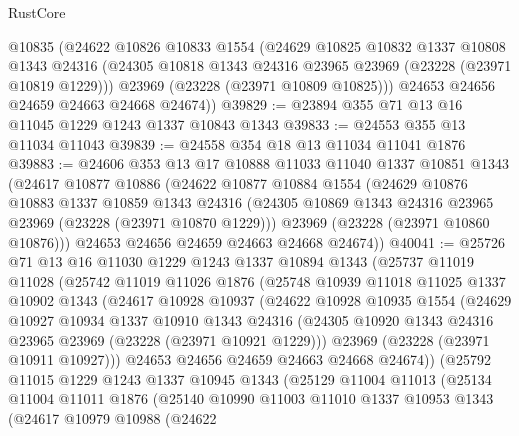 \begin{lexlean}{RustCore}
\begin{coremodule}
      @10835
      (@24622
        @10826
        @10833
        @1554
        (@24629
          @10825
          @10832
          @1337
          @10808
          @1343
          @24316
          (@24305 @10818 @1343 @24316 @23965 @23969 (@23228 (@23971 @10819 @1229)))
          @23969
          (@23228 (@23971 @10809 @10825)))
        @24653
        @24656
        @24659
        @24663
        @24668
        @24674))
@39829 := @23894 @355 @71 @13 @16 @11045 @1229 @1243 @1337 @10843 @1343
@39833 := @24553 @355 @13 @11034 @11043
@39839 := @24558 @354 @18 @13 @11034 @11041 @1876
@39883 := @24606
    @353
    @13
    @17
    @10888
    @11033
    @11040
    @1337
    @10851
    @1343
    (@24617
      @10877
      @10886
      (@24622
        @10877
        @10884
        @1554
        (@24629
          @10876
          @10883
          @1337
          @10859
          @1343
          @24316
          (@24305 @10869 @1343 @24316 @23965 @23969 (@23228 (@23971 @10870 @1229)))
          @23969
          (@23228 (@23971 @10860 @10876)))
        @24653
        @24656
        @24659
        @24663
        @24668
        @24674))
@40041 := @25726
    @71
    @13
    @16
    @11030
    @1229
    @1243
    @1337
    @10894
    @1343
    (@25737
      @11019
      @11028
      (@25742
        @11019
        @11026
        @1876
        (@25748
          @10939
          @11018
          @11025
          @1337
          @10902
          @1343
          (@24617
            @10928
            @10937
            (@24622
              @10928
              @10935
              @1554
              (@24629
                @10927
                @10934
                @1337
                @10910
                @1343
                @24316
                (@24305 @10920 @1343 @24316 @23965 @23969 (@23228 (@23971 @10921 @1229)))
                @23969
                (@23228 (@23971 @10911 @10927)))
              @24653
              @24656
              @24659
              @24663
              @24668
              @24674))
          (@25792
            @11015
            @1229
            @1243
            @1337
            @10945
            @1343
            (@25129
              @11004
              @11013
              (@25134
                @11004
                @11011
                @1876
                (@25140
                  @10990
                  @11003
                  @11010
                  @1337
                  @10953
                  @1343
                  (@24617
                    @10979
                    @10988
                    (@24622

\end{coremodule}
\end{lexlean}
